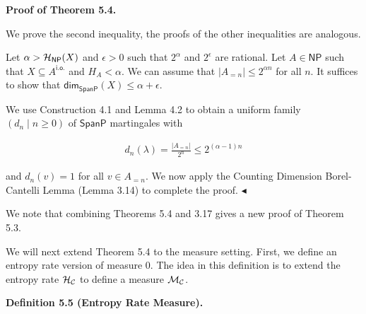 \documentclass[10pt,a4paper]{article}
\begin{document}



\par\medskip\noindent\textbf{Proof of Theorem 5.4.}\par




We prove the second inequality, the proofs of the other inequalities are analogous.\par




Let $\alpha>{\cal H}_{\mathsf{NP}}(X)$ and $\epsilon>0$ such that $2^{\alpha}$ and
$2^{\epsilon}$ are rational. Let $A\in\mathsf{NP}$ such that $X\subseteq A^{\mathsf{i.o.}}$ and $H_{A}<\alpha$. We can assume that $|A_{=n}|\leq 2^{\alpha n}$ for all $n$. It suffices to show that ${\mathsf{dim}}_{\mathsf{SpanP}}(X)\leq\alpha+\epsilon$.\par




We use Construction 4.1 and Lemma 4.2 to obtain a uniform family $(d_{n}\mid n\geq 0)$ of $\mathsf{SpanP}$ martingales with\par


\[\begin{gathered}
d_{n}(\lambda)=\frac{|A_{=n}|}{2^{n}}\leq 2^{(\alpha-1)n}
\end{gathered}\]


and $d_{n}(v)=1$ for all $v\in A_{=n}$. We now apply the Counting Dimension Borel-Cantelli Lemma (Lemma 3.14) to complete the proof.
$\blacktriangleleft$\par




We note that combining Theorems 5.4 and 3.17 gives a new proof of Theorem 5.3.\par




We will next extend Theorem 5.4 to the measure setting. First, we define an entropy rate version of measure 0. The idea in this definition is to extend the entropy rate ${\cal H}_{\cal C}$ to define a measure ${{\cal M}_{{\cal C}}}$.\par





\par\medskip\noindent\textbf{
\textbf{Definition 5.5}\textbf{ }(Entropy Rate Measure)\textbf{.}
}\par
\end{document}
